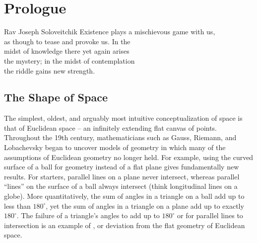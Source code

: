 \chapter*{Prologue}

\begin{epigraph}{19.5em}{Rav Joseph Soloveitchik}
	Existence plays a mischievous game with us,\\
	as though to tease and provoke us. In the \\
	midst of knowledge there yet again arises \\
	the mystery; in the midst of contemplation\\
	the riddle gains new strength.
\end{epigraph}
%
\section*{The Shape of Space}

The simplest, oldest, and arguably most intuitive conceptualization of space is that of Euclidean space -- an infinitely extending flat canvas of points.
Throughout the 19th century, mathematicians such as Gauss, Riemann, and Lobachevsky began to uncover models of geometry in which many of the assumptions of Euclidean geometry no longer held.
For example, using the curved surface of a ball for geometry instead of a flat plane gives fundamentally new results. For starters, parallel lines on a plane never intersect, whereas parallel ``lines'' on the surface of a ball always intersect (think longitudinal lines on a globe).
More quantitatively, the sum of angles in a triangle on a ball add up to less than $180^\circ$, yet the sum of angles in a triangle on a plane add up to exactly $180^\circ$. The failure of a triangle's angles to add up to $180^\circ$ or for parallel lines to intersection is an example of , or deviation from the flat geometry of Euclidean space.

